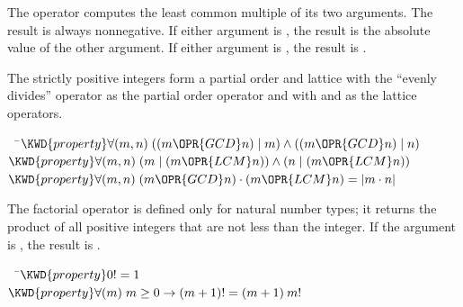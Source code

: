 The operator  computes the least common multiple of its two arguments.
The result is always nonnegative.  If either argument is , the result
is the absolute value of the other argument.  If either argument is , the result is .

The strictly positive integers form a partial order and lattice with
the ``evenly divides'' operator \EXP{\mid} as the partial order operator and
with  and  as the lattice operators.


\begin{Fortress}
{\tt~~}\pushtabs\=\+\(  \KWD{property} \forall (m, n)\; ((m \OPR{GCD} n) \mid m) \wedge ((m \OPR{GCD} n) \mid n)\)\\
\(  \KWD{property} \forall (m, n)\; (m \mid (m \OPR{LCM} n)) \wedge (n \mid (m \OPR{LCM} n))\)\\
\(  \KWD{property} \forall (m, n)\; (m \OPR{GCD} n) \cdot (m \OPR{LCM} n) = \left|m \cdot n\right|\)\-\\\poptabs
\end{Fortress}





The factorial operator is defined only for natural number types;
it returns the product of all positive integers that are not less than the integer.
If the argument is , the result is .

\begin{Fortress}
{\tt~~}\pushtabs\=\+\(  \KWD{property} 0! = 1\)\\
\(  \KWD{property} \forall (m)\; m \geq 0 \rightarrow (m+1)! = (m+1)\:m!\)\-\\\poptabs
\end{Fortress}


